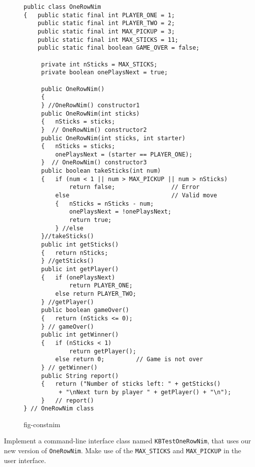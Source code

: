 \begin{figure}[p]
\jjjprogstart
\begin{jjjlisting}
\begin{lstlisting}
public class OneRowNim
{   public static final int PLAYER_ONE = 1;
    public static final int PLAYER_TWO = 2;
    public static final int MAX_PICKUP = 3;
    public static final int MAX_STICKS = 11;
    public static final boolean GAME_OVER = false;

     private int nSticks = MAX_STICKS;
     private boolean onePlaysNext = true;

     public OneRowNim()
     {
     } //OneRowNim() constructor1
     public OneRowNim(int sticks)
     {   nSticks = sticks;
     }  // OneRowNim() constructor2
     public OneRowNim(int sticks, int starter)
     {   nSticks = sticks;
         onePlaysNext = (starter == PLAYER_ONE);
     }  // OneRowNim() constructor3
     public boolean takeSticks(int num)
     {   if (num < 1 || num > MAX_PICKUP || num > nSticks) 
             return false;                // Error
         else                             // Valid move
         {   nSticks = nSticks - num;
             onePlaysNext = !onePlaysNext;
             return true;
         } //else
     }//takeSticks()
     public int getSticks()
     {   return nSticks;
     } //getSticks()
     public int getPlayer()
     {   if (onePlaysNext) 
             return PLAYER_ONE;
         else return PLAYER_TWO;
     } //getPlayer()
     public boolean gameOver()
     {   return (nSticks <= 0);
     } // gameOver()
     public int getWinner()
     {   if (nSticks < 1) 
             return getPlayer();
         else return 0;         // Game is not over
     } // getWinner()
     public String report()
     {   return ("Number of sticks left: " + getSticks()
          + "\nNext turn by player " + getPlayer() + "\n");
     }   // report()
} // OneRowNim class
\end{lstlisting}
\end{jjjlisting}
{fig-constnim}
\end{figure}

\begin{SSTUDY}

\item  Implement a command-line interface class named
{\tt KBTestOneRowNim}, that uses our new version of {\tt OneRowNim}.
Make use of the {\tt MAX\_STICKS} and {\tt MAX\_PICKUP} in the user
interface.  

\end{SSTUDY}

